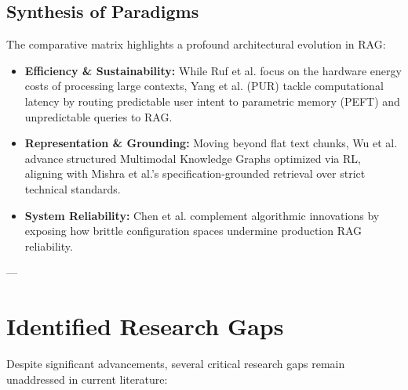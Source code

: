 \documentclass[10pt,journal,compsoc]{IEEEtran}
\begin{document}
\subsection{Synthesis of Paradigms}
The comparative matrix highlights a profound architectural evolution in RAG:
\begin{itemize}
    \item \textbf{Efficiency & Sustainability:} While Ruf et al. focus on the hardware energy costs of processing large contexts, Yang et al. (PUR) tackle computational latency by routing predictable user intent to parametric memory (PEFT) and unpredictable queries to RAG.
    \item \textbf{Representation & Grounding:} Moving beyond flat text chunks, Wu et al. advance structured Multimodal Knowledge Graphs optimized via RL, aligning with Mishra et al.'s specification-grounded retrieval over strict technical standards.
    \item \textbf{System Reliability:} Chen et al. complement algorithmic innovations by exposing how brittle configuration spaces undermine production RAG reliability.
\end{itemize}

---

\section{Identified Research Gaps}

Despite significant advancements, several critical research gaps remain unaddressed in current literature:
\end{document}
